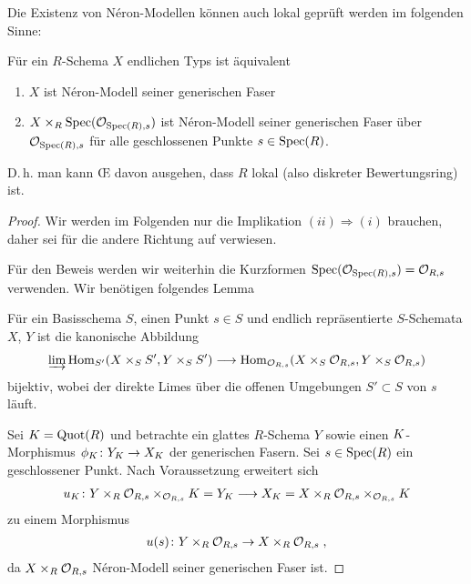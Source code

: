 \documentclass[german]{scrreprt}
\begin{document}
Die Existenz von Néron-Modellen können auch lokal geprüft werden im
folgenden Sinne:
\begin{Satz}\label{thm:neronmodelllokal}
  Für ein $R$-Schema $X$ endlichen Typs ist äquivalent
  \begin{enumerate}[label=(\roman*)]
  \item $X$ ist Néron-Modell seiner generischen Faser
  \item $X\times_R\operatorname{Spec}(\mathcal{O}_{\operatorname{Spec}(R),s})$ ist Néron-Modell
    seiner generischen Faser über $\mathcal{O}_{\operatorname{Spec}(R),s}$ für alle
    geschlossenen Punkte $s\in\operatorname{Spec}(R)$.
  \end{enumerate}
  D.\,h. man kann \OE{} davon ausgehen, dass $R$ lokal (also diskreter
  Bewertungsring) ist.
  \cite[1.2, Proposition 4]{neron}
  \begin{proof}
    Wir werden im Folgenden nur die Implikation $(ii)\Rightarrow(i)$
    brauchen, daher sei für die andere Richtung auf
    \cite[1.2, Proposition 4]{neron} verwiesen.
    
    Für den Beweis werden wir weiterhin die Kurzformen
    $\operatorname{Spec}(\mathcal{O}_{\operatorname{Spec}(R),s})=\mathcal{O}_{R,s}$ verwenden.
    Wir benötigen folgendes Lemma
    \begin{Lemma}\label{thm:limesoffenemengen}
      \cite[1.2, Lemma 5]{neron}
      Für ein Basisschema $S$, einen Punkt $s\in S$ und endlich
      repräsentierte $S$-Schemata $X$, $Y$ ist die kanonische
      Abbildung
      \begin{gather*}
        \varinjlim \operatorname{Hom}_{S'}(X\times_S S', Y\times_S S')
        \longrightarrow
        \operatorname{Hom}_{\mathcal{O}_{R,s}}(X\times_S \mathcal{O}_{R,s}, Y\times_S \mathcal{O}_{R,s})
      \end{gather*}
      bijektiv, wobei der direkte Limes über die offenen Umgebungen
      $S'\subset S$ von $s$ läuft.
    \end{Lemma}
    
    Sei $K=\operatorname{Quot}(R)$ und betrachte ein glattes $R$-Schema $Y$ sowie
    einen $K$-Morphismus $\phi_{K}\colon Y_{K}\to X_{K}$ der
    generischen Fasern.
    Sei $s\in\operatorname{Spec}(R)$ ein geschlossener Punkt.
    Nach Voraussetzung erweitert sich
    \begin{gather*}
      u_{K}\colon
      Y\times_R\mathcal{O}_{R,s}\times_{\mathcal{O}_{R,s}}K = Y_{K}
      \longrightarrow
      X_{K} = X\times_R\mathcal{O}_{R,s}\times_{\mathcal{O}_{R,s}}K
    \end{gather*}
    zu einem Morphismus
    \begin{gather*}
      u(s)\colon Y\times_R\mathcal{O}_{R,s}\to X\times_R\mathcal{O}_{R,s}\;,
    \end{gather*}
    da $X\times_R\mathcal{O}_{R,s}$ Néron-Modell seiner generischen Faser ist.


\end{proof}
\end{Satz}
\end{document}
